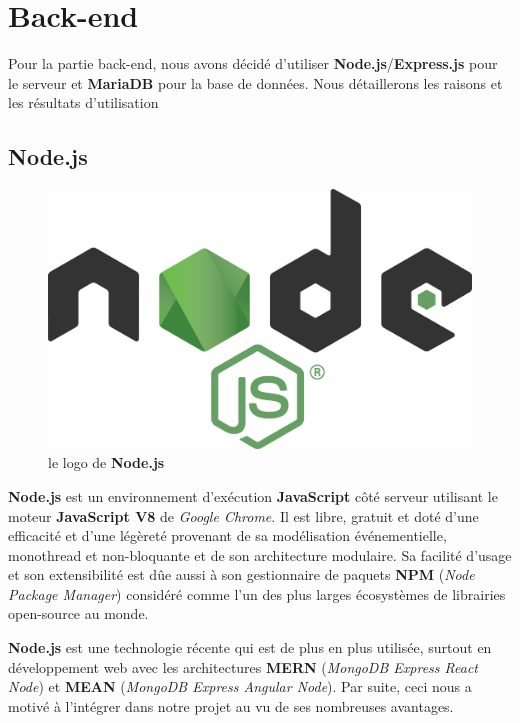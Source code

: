 \documentclass[a4paper,12pt]{report}
\theoremstyle{break}
\theoremstyle{break}
\theoremstyle{break}
\theoremstyle{break}
\theoremstyle{definition}
\theoremstyle{remark}
\begin{document}
\section{Back-end}
Pour la partie back-end, nous avons décidé d'utiliser \textbf{Node.js}/\textbf{Express.js} pour le serveur et \textbf{MariaDB} pour la base de données. Nous détaillerons les raisons et les résultats d'utilisation
\subsection{Node.js}
\begin{figure}[!ht]
  \centering
  \includegraphics[scale=0.05]{images/nodejs_icon.png}
  \caption{le logo de \textbf{Node.js}}
\end{figure}

\textbf{Node.js} est un environnement d'exécution \textbf{JavaScript} côté serveur utilisant le moteur \textbf{JavaScript V8} de \textit{Google Chrome}. Il est libre, gratuit et doté d'une efficacité et d'une légèreté provenant de sa modélisation événementielle, monothread et non-bloquante et de son architecture modulaire. Sa facilité d'usage et son extensibilité est dûe aussi à son gestionnaire de paquets \textbf{NPM} (\textit{Node Package Manager}) considéré comme l'un des plus larges écosystèmes de librairies open-source au monde.

\textbf{Node.js} est une technologie récente qui est de plus en plus utilisée, surtout en développement web avec les architectures \textbf{MERN} (\textit{MongoDB Express React Node}) et \textbf{MEAN} (\textit{MongoDB Express Angular Node}). Par suite, ceci nous a motivé à l'intégrer dans notre projet au vu de ses nombreuses avantages.
\end{document}

